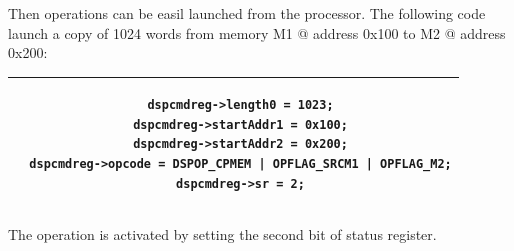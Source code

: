 \documentclass[11pt]{article}
\begin{document}
Then operations can be easil launched from the processor.
The following code launch a copy of 1024 words from memory M1 @ address 0x100 to M2 @ address 0x200:

\begin{tabular}{|c|}
\hline
\begin{minipage}{0.98\textwidth}
\begin{verbatim}
  dspcmdreg->length0 = 1023;
  dspcmdreg->startAddr1 = 0x100;
  dspcmdreg->startAddr2 = 0x200;
  dspcmdreg->opcode = DSPOP_CPMEM | OPFLAG_SRCM1 | OPFLAG_M2;
  dspcmdreg->sr = 2;
\end{verbatim}
\end{minipage}
\\\hline
\end{tabular}

The operation is activated by setting the second bit of status register.
\end{document}
